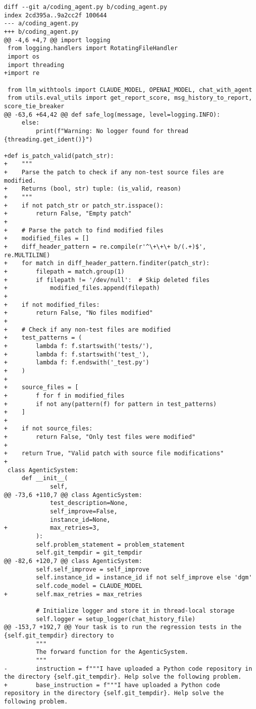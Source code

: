 \begin{lstlisting}[style=diffstyle]
diff --git a/coding_agent.py b/coding_agent.py
index 2cd395a..9a2cc2f 100644
--- a/coding_agent.py
+++ b/coding_agent.py
@@ -4,6 +4,7 @@ import logging
 from logging.handlers import RotatingFileHandler
 import os
 import threading
+import re
 
 from llm_withtools import CLAUDE_MODEL, OPENAI_MODEL, chat_with_agent
 from utils.eval_utils import get_report_score, msg_history_to_report, score_tie_breaker
@@ -63,6 +64,42 @@ def safe_log(message, level=logging.INFO):
     else:
         print(f"Warning: No logger found for thread {threading.get_ident()}")
 
+def is_patch_valid(patch_str):
+    """
+    Parse the patch to check if any non-test source files are modified.
+    Returns (bool, str) tuple: (is_valid, reason)
+    """
+    if not patch_str or patch_str.isspace():
+        return False, "Empty patch"
+    
+    # Parse the patch to find modified files
+    modified_files = []
+    diff_header_pattern = re.compile(r'^\+\+\+ b/(.+)$', re.MULTILINE)
+    for match in diff_header_pattern.finditer(patch_str):
+        filepath = match.group(1)
+        if filepath != '/dev/null':  # Skip deleted files
+            modified_files.append(filepath)
+    
+    if not modified_files:
+        return False, "No files modified"
+        
+    # Check if any non-test files are modified
+    test_patterns = (
+        lambda f: f.startswith('tests/'),
+        lambda f: f.startswith('test_'),
+        lambda f: f.endswith('_test.py')
+    )
+    
+    source_files = [
+        f for f in modified_files 
+        if not any(pattern(f) for pattern in test_patterns)
+    ]
+    
+    if not source_files:
+        return False, "Only test files were modified"
+    
+    return True, "Valid patch with source file modifications"
+
 class AgenticSystem:
     def __init__(
             self,
@@ -73,6 +110,7 @@ class AgenticSystem:
             test_description=None,
             self_improve=False,
             instance_id=None,
+            max_retries=3,
         ):
         self.problem_statement = problem_statement
         self.git_tempdir = git_tempdir
@@ -82,6 +120,7 @@ class AgenticSystem:
         self.self_improve = self_improve
         self.instance_id = instance_id if not self_improve else 'dgm'
         self.code_model = CLAUDE_MODEL
+        self.max_retries = max_retries
 
         # Initialize logger and store it in thread-local storage
         self.logger = setup_logger(chat_history_file)
@@ -153,7 +192,7 @@ Your task is to run the regression tests in the {self.git_tempdir} directory to
         """
         The forward function for the AgenticSystem.
         """
-        instruction = f"""I have uploaded a Python code repository in the directory {self.git_tempdir}. Help solve the following problem.
+        base_instruction = f"""I have uploaded a Python code repository in the directory {self.git_tempdir}. Help solve the following problem.
 

\end{lstlisting}
